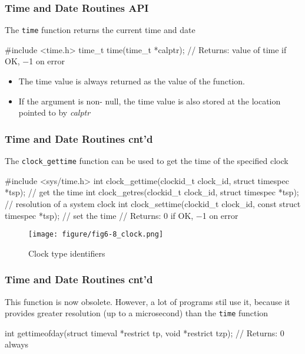 \documentclass[newPxFont,sthlmFooter,nooffset]{beamer}
\begin{document}
\begin{frame}[containsverbatim,t]
  \frametitle{Time and Date Routines API}
The \texttt{time} function returns the current time and date
\begin{codedef}
#include <time.h>
time_t time(time_t *calptr);
// Returns: value of time if OK, −1 on error
\end{codedef}
\begin{itemize}
\item The time value is always returned as the value of the
  function.
\item If the argument is non- null, the time value is also
  stored at the location pointed to by \textit{calptr}
\end{itemize}
\end{frame}


\begin{frame}[containsverbatim,t]
  \frametitle{Time and Date Routines cnt'd}

The \texttt{clock\_gettime} function can be used to get the time of the specified clock

\begin{codedef}
#include <sys/time.h>
int clock_gettime(clockid_t clock_id, struct timespec *tsp); // get the time
int clock_getres(clockid_t clock_id, struct timespec *tsp); // resolution of a system clock
int clock_settime(clockid_t clock_id, const struct timespec *tsp); // set the time
// Returns: 0 if OK, −1 on error
\end{codedef}

\begin{figure}[h]
  \centering
  \texttt{[image: figure/fig6-8\_clock.png]}
  \caption{Clock type identifiers}
\end{figure}

\end{frame}

\begin{frame}[containsverbatim,t]
  \frametitle{Time and Date Routines cnt'd}
This function is now obsolete. However, a lot of programs stil use it, because it provides greater resolution (up to a microsecond) than the \texttt{time} function
\begin{codedef}
int gettimeofday(struct timeval *restrict tp, void *restrict tzp);
// Returns: 0 always
\end{codedef}


\end{frame}
\end{document}
